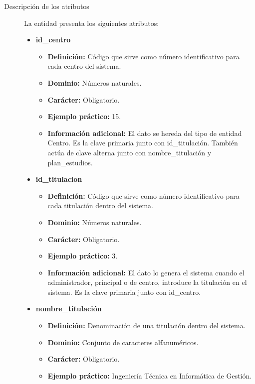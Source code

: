 \begin{description}
   \item[Descripción de los atributos] La entidad presenta los siguientes
   atributos:

   \begin{itemize}
   \item \textbf{id\_centro}
      \begin{itemize}
         \item \textbf{Definición:} Código que sirve como número identificativo
               para cada centro del sistema.
         \item \textbf{Dominio:} Números naturales.
         \item \textbf{Carácter:} Obligatorio.
         \item \textbf{Ejemplo práctico:} 15.
         \item \textbf{Información adicional:} El dato se hereda del tipo de
         entidad Centro. Es la clave primaria junto con id\_titulación. También
         actúa de clave alterna junto con nombre\_titulación y plan\_estudios.
      \end{itemize}
   \item \textbf{id\_titulacion}
      \begin{itemize}
         \item \textbf{Definición:} Código que sirve como número identificativo
         para cada titulación dentro del sistema.
         \item \textbf{Dominio:} Números naturales.
         \item \textbf{Carácter:} Obligatorio.
         \item \textbf{Ejemplo práctico:} 3.
         \item \textbf{Información adicional:} El dato lo genera el sistema
         cuando el administrador, principal o de centro, introduce la titulación
         en el sistema. Es la clave primaria junto con id\_centro.
      \end{itemize}
   \item \textbf{nombre\_titulación}
      \begin{itemize}
         \item \textbf{Definición:} Denominación de una titulación dentro del sistema.
         \item \textbf{Dominio:} Conjunto de caracteres alfanuméricos.
         \item \textbf{Carácter:} Obligatorio.
         \item \textbf{Ejemplo práctico:} Ingeniería Técnica en Informática de Gestión.

\end{itemize}
\end{itemize}
\end{description}
